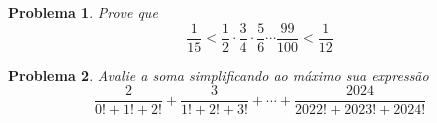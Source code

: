 \documentclass{hipatia}
\newtheorem{problem*}{Problema}
\begin{document}
\begin{problem*}
Prove que $$\frac{1}{15} < \frac{1}{2}\cdot \frac{3}{4} \cdot \frac{5}{6} \cdots \frac{99}{100} < \frac{1}{12}$$
	
\end{problem*}

\begin{problem*}
Avalie a soma simplificando ao máximo sua expressão $$\frac{2}{0! + 1! + 2!} + \frac{3}{1! + 2! + 3!} + \cdots + \frac{2024}{2022! + 2023! + 2024!} $$
	
\end{problem*}

\nocite{*}
\vfill


\pagebreak 
\end{document}
